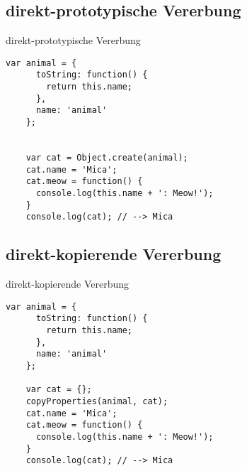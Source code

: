\newcommand{\hla}[1]{\textcolor{stringcolor}{#1}}
\newcommand{\hlb}[1]{\textcolor{keywordcolor}{#1}}


\subsection{direkt-prototypische Vererbung}

\begin{frame}[fragile]{direkt-prototypische Vererbung}
  \begin{lstlisting}[gobble=4]
    var animal = {
      toString: function() {
        return this.name;
      },
      name: 'animal'
    };
    
    
    var cat = Object.create(animal);
    cat.name = 'Mica';
    cat.meow = function() {
      console.log(this.name + ': Meow!');
    }
    console.log(cat); // --> Mica
  \end{lstlisting}
\end{frame}

\subsection{direkt-kopierende Vererbung}

\begin{frame}[fragile]{direkt-kopierende Vererbung}
  \begin{lstlisting}[gobble=4]
    var animal = {
      toString: function() {
        return this.name;
      },
      name: 'animal'
    };
      
    var cat = {};
    copyProperties(animal, cat);
    cat.name = 'Mica';
    cat.meow = function() {
      console.log(this.name + ': Meow!');
    }
    console.log(cat); // --> Mica
  \end{lstlisting}
\end{frame}

